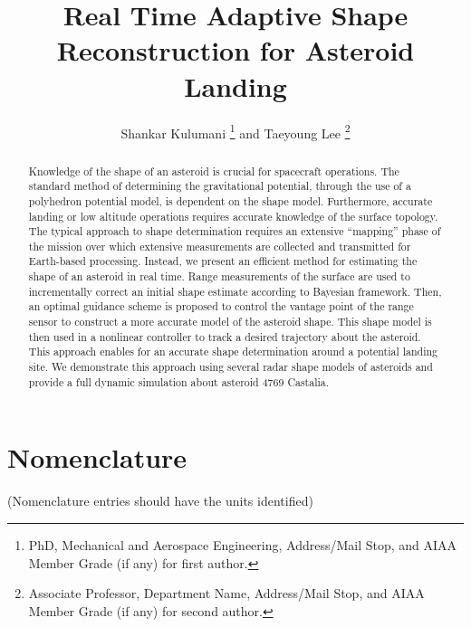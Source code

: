 \documentclass[journal]{new-aiaa}
\title{Real Time Adaptive Shape Reconstruction for Asteroid Landing}
\author{Shankar Kulumani \footnote{PhD, Mechanical and Aerospace Engineering, Address/Mail Stop, and AIAA Member Grade (if any) for first author.} and Taeyoung Lee \footnote{Associate Professor, Department Name, Address/Mail Stop, and AIAA Member Grade (if any) for second author.}}
\affil{Goerge Washington University, Washington, DC, 20052}
\begin{document}
\maketitle

\begin{abstract}
    Knowledge of the shape of an asteroid is crucial for spacecraft operations.
    The standard method of determining the gravitational potential, through the use of a polyhedron potential model, is dependent on the shape model.
    Furthermore, accurate landing or low altitude operations requires accurate knowledge of the surface topology. 
    The typical approach to shape determination requires an extensive ``mapping'' phase of the mission over which extensive measurements are collected and transmitted for Earth-based processing.
    Instead, we present an efficient method for estimating the shape of an asteroid in real time.
    Range measurements of the surface are used to incrementally correct an initial shape estimate according to Bayesian framework. 
    Then, an optimal guidance scheme is proposed to control the vantage point of the range sensor to construct a more accurate model of the asteroid shape. 
    This shape model is then used in a nonlinear controller to track a desired trajectory about the asteroid.
    This approach enables for an accurate shape determination around a potential landing site.
    We demonstrate this approach using several radar shape models of asteroids and provide a full dynamic simulation about asteroid 4769 Castalia.
\end{abstract}

\section*{Nomenclature}

\noindent(Nomenclature entries should have the units identified)
\end{document}
